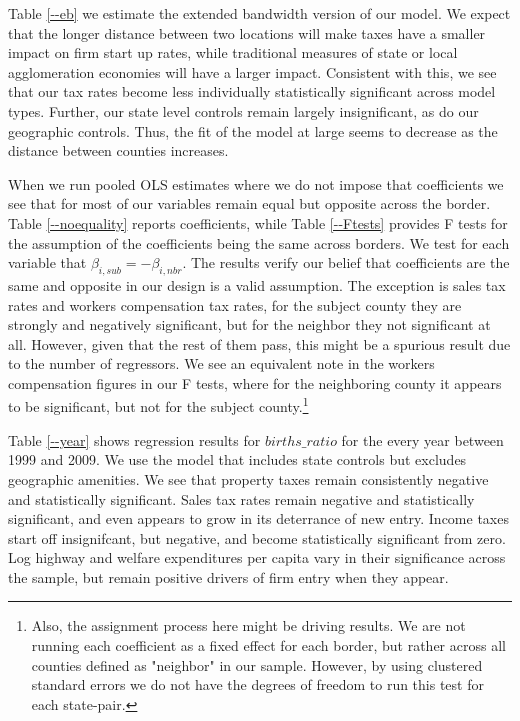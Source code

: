Table \ref{--eb} we estimate the extended bandwidth version of our model. We expect that the longer distance between two locations will make taxes have a smaller impact on firm start up rates, while traditional measures of state or local agglomeration economies will have a larger impact. Consistent with this, we see that our tax rates become less individually statistically significant across model types. Further, our state level controls remain largely insignificant, as do our geographic controls. Thus, the fit of the model at large seems to decrease as the distance between counties increases.

When we run pooled OLS estimates where we do not impose that coefficients we see that for most of our variables remain equal but opposite across the border. Table \ref{--noequality} reports coefficients, while Table \ref{--Ftests} provides F tests for the assumption of the coefficients being the same across borders. We test for each variable that $\beta_{i,sub} = - \beta_{i,nbr}$. The results verify our belief that coefficients are the same and opposite in our design is a valid assumption. The exception is sales tax rates and workers compensation tax rates, for the subject county they are strongly and negatively significant, but for the neighbor they not significant at all. However, given that the rest of them pass, this might be a spurious result due to the number of regressors. We see an equivalent note in the workers compensation figures in our F tests, where for the neighboring county it appears to be significant, but not for the subject county.\footnote{Also, the assignment process here might be driving results. We are not running each coefficient as a fixed effect for each border, but rather across all counties defined as "neighbor" in our sample. However, by using clustered standard errors we do not have the degrees of freedom to run this test for each state-pair.} 

Table \ref{--year} shows regression results for $births\_ratio$ for the every year between 1999 and 2009. We use the model that includes state controls but excludes geographic amenities. We see that property taxes remain consistently negative and statistically significant. Sales tax rates remain negative and statistically significant, and even appears to grow in its deterrance of new entry. Income taxes start off insignifcant, but negative, and become statistically significant from zero. Log highway and welfare expenditures per capita vary in their significance across the sample, but remain positive drivers of firm entry when they appear.

